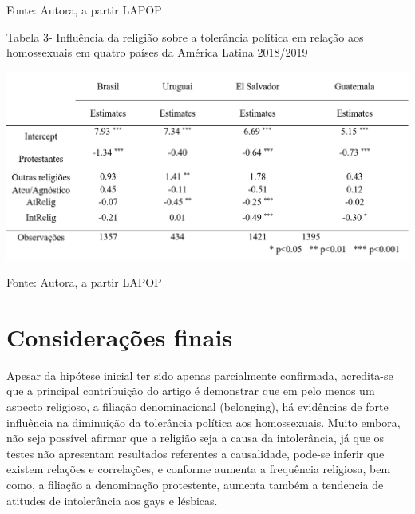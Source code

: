 \documentclass[
]{article}
\begin{document}
Fonte: Autora, a partir LAPOP

Tabela 3- Influência da religião sobre a tolerância política em relação
aos homossexuais em quatro países da América Latina 2018/2019

\begin{center}\includegraphics[width=0.8\linewidth]{tabela3} \end{center}

Fonte: Autora, a partir LAPOP

\vspace{5truemm}

\hypertarget{considerauxe7uxf5es-finais}{%
\section{Considerações finais}\label{considerauxe7uxf5es-finais}}

Apesar da hipótese inicial ter sido apenas parcialmente confirmada,
acredita-se que a principal contribuição do artigo é demonstrar que em
pelo menos um aspecto religioso, a filiação denominacional (belonging),
há evidências de forte influência na diminuição da tolerância política
aos homossexuais. Muito embora, não seja possível afirmar que a religião
seja a causa da intolerância, já que os testes não apresentam resultados
referentes a causalidade, pode-se inferir que existem relações e
correlações, e conforme aumenta a frequência religiosa, bem como, a
filiação a denominação protestente, aumenta também a tendencia de
atitudes de intolerância aos gays e lésbicas.
\end{document}
